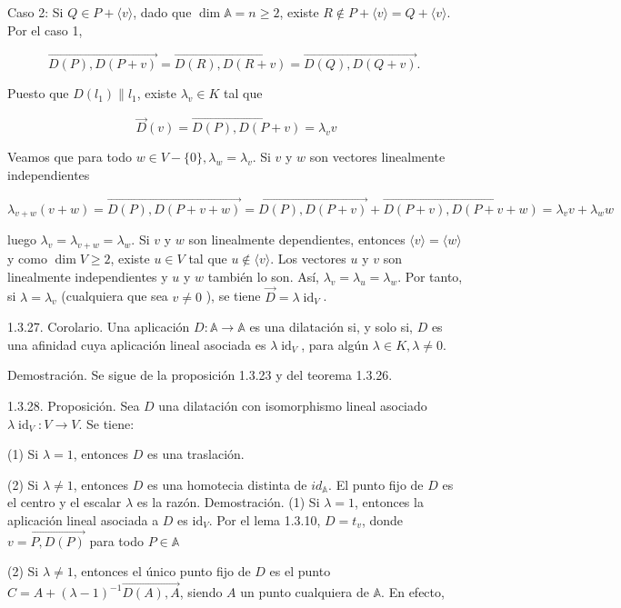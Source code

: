 \documentclass[12pt, a4paper, ones, notitlepage, openany,titlepage]{article}
\begin{document}
Caso 2: Si $Q \in P+\langle v\rangle$, dado que $\dim  \mathbb{A}=n \geq 2$, existe $R \notin P+\langle v\rangle=Q+\langle v\rangle$. Por el caso 1,

$$
\overrightarrow{D(P), D(P+v)}=\overrightarrow{D(R), D(R+v)}=\overrightarrow{D(Q), D(Q+v)} \text {. }
$$

Puesto que $D\left(l_{1}\right) \| l_{1}$, existe $\lambda_{v} \in K$ tal que

$$
\vec{D}(v)=\overrightarrow{D(P), D(P+v)}=\lambda_{v} v
$$

Veamos que para todo $w \in V-\{0\}, \lambda_{w}=\lambda_{v}$. Si $v$ y $w$ son vectores linealmente independientes

$$
\lambda_{v+w}(v+w)=\overrightarrow{D(P), D(P+v+w)}=\overrightarrow{D(P), D(P+v)}+\overrightarrow{D(P+v), D(P+v+w)}=\lambda_{v} v+\lambda_{w} w
$$

luego $\lambda_{v}=\lambda_{v+w}=\lambda_{w}$. Si $v$ y $w$ son linealmente dependientes, entonces $\langle v\rangle=\langle w\rangle$ y como $\dim  V \geq 2$, existe $u \in V$ tal que $u \notin\langle v\rangle$. Los vectores $u$ y $v$ son linealmente independientes y $u$ y $w$ también lo son. Así, $\lambda_{v}=\lambda_{u}=\lambda_{w}$. Por tanto, si $\lambda=\lambda_{v}$ (cualquiera que sea $v \neq 0$ ), se tiene $\vec{D}=\lambda \operatorname{id}_{V}$.

1.3.27. Corolario. Una aplicación $D: \mathbb{A} \rightarrow \mathbb{A}$ es una dilatación si, y solo si, $D$ es una afinidad cuya aplicación lineal asociada es $\lambda \operatorname{id}_{V}$, para algún $\lambda \in K, \lambda \neq 0$.

Demostración. Se sigue de la proposición 1.3.23 y del teorema 1.3.26.

1.3.28. Proposición. Sea $D$ una dilatación con isomorphismo lineal asociado $\lambda \operatorname{id}_{V}: V \rightarrow V$. Se tiene:

(1) Si $\lambda=1$, entonces $D$ es una traslación.

(2) Si $\lambda \neq 1$, entonces $D$ es una homotecia distinta de $i d_{\mathbb{A}}$. El punto fijo de $D$ es el centro y el escalar $\lambda$ es la razón. Demostración. (1) Si $\lambda=1$, entonces la aplicación lineal asociada a $D$ es $\mathrm{id}_{V}$. Por el lema 1.3.10, $D=t_{v}$, donde $v=\overrightarrow{P, D(P)}$ para todo $P \in \mathbb{A}$

(2) Si $\lambda \neq 1$, entonces el único punto fijo de $D$ es el punto $C=A+(\lambda-1)^{-1} \overrightarrow{D(A), A}$, siendo $A$ un punto cualquiera de $\mathbb{A}$. En efecto,
\end{document}
